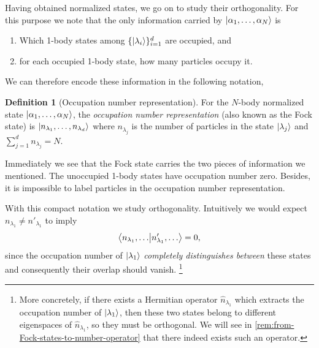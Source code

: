\documentclass{article}
\theoremstyle{definition}
\newtheorem{dfn}[mot]{Definition}
\numberwithin{equation}{section}
\begin{document}
    Having obtained normalized states, 
    we go on to study their orthogonality. 
    For this purpose we note that 
    the only information carried by $\ket{\alpha_1, \ldots ,\alpha_{N}}$ 
    is 
    \begin{enumerate}
        \item 
        Which 1-body states among $\{\ket{\lambda_{i}}\}_{i = 1}^{d}$ 
        are occupied, and 
        \item
        for each occupied 1-body state, 
        how many particles occupy it.
    \end{enumerate}

    We can therefore encode these information 
    in the following notation, 

    \begin{dfn}[Occupation number representation]
        For the $N$-body normalized state 
        $\ket{\alpha_1, \ldots ,\alpha_{N}}$, 
        the \textit{occupation number representation} 
        (also known as the Fock state) is 
        $\ket{n_{\lambda_{1}}, \ldots ,n_{\lambda_{d}}}$ 
        where $n_{\lambda_{j}}$ is the number of particles 
        in the state $\ket{\lambda_{j}}$ and 
        $\sum_{j=1}^{d}n_{\lambda_{j}}=N$.
    \end{dfn}

    Immediately we see that the Fock state 
    carries the two pieces of information we mentioned. 
    The unoccupied 1-body states have occupation number zero. 
    Besides, it is impossible to label particles 
    in the occupation number representation.

    With this compact notation we study orthogonality. 
    Intuitively we would expect 
    $n_{\lambda_{1}}\neq n'_{\lambda_{1}}$ to 
    imply 
    \begin{equation}
        \bra{n_{\lambda_{1}}, \ldots }\ket{n'_{\lambda_{1}}, \ldots }=0,
    \label{eqn:orthogonality-of-Fock-states}
    \end{equation}
    since the occupation number of $\ket{\lambda_{1}}$ 
    \textit{completely distinguishes between} these states and 
    consequently their overlap should vanish.
    \footnote{
        More concretely, if there exists a Hermitian operator 
        $\hat{n}_{\lambda_{1}}$ which extracts the occupation number 
        of $\ket{\lambda_{1}}$, then these two states belong to 
        different eigenspaces of $\hat{n}_{\lambda_{1}}$, so they 
        must be orthogonal. We will see 
        in \cref{rem:from-Fock-states-to-number-operator} 
        that there indeed 
        exists such an operator.
    }
\end{document}
